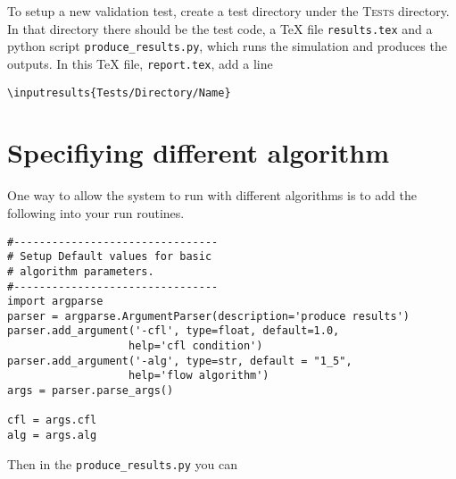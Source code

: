 \documentclass[11pt,a4paper]{report}
\begin{document}
To setup a new validation test, create a test directory under the
\textsc{Tests} directory. In that directory there should be the test code, a
\TeX{} file \texttt{results.tex} and a python script
\texttt{produce\_results.py}, which runs the simulation and produces the
outputs. In this \TeX{} file, \texttt{report.tex}, add a line
\begin{verbatim}
\inputresults{Tests/Directory/Name}
\end{verbatim}



\section{Specifiying different algorithm}
One  way to allow the system to run with different algorithms is to add the following
into your run routines.
\begin{verbatim}
#--------------------------------
# Setup Default values for basic
# algorithm parameters.
#--------------------------------
import argparse
parser = argparse.ArgumentParser(description='produce results')
parser.add_argument('-cfl', type=float, default=1.0,
                   help='cfl condition')
parser.add_argument('-alg', type=str, default = "1_5",
                   help='flow algorithm')
args = parser.parse_args()

cfl = args.cfl
alg = args.alg
\end{verbatim}

Then in the \texttt{produce\_results.py} you can 
\end{document}
